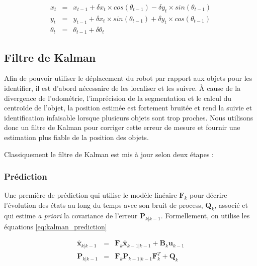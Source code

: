 \begin{equation}
	\begin{array}{rcl}
		x_t &=& x_{t-1} + \delta x_{t} \times cos(\theta_{t-1}) - \delta y_{t} \times sin(\theta_{t-1}) \\
		y_t &=& y_{t-1} + \delta x_{t} \times sin(\theta_{t-1}) + \delta y_{t} \times cos(\theta_{t-1}) \\
		\theta_t &=& \theta_{t-1} + \delta\theta_{t}
	\end{array}
	\label{eq:integ}
\end{equation}

\subsection{Filtre de Kalman }

Afin de pouvoir utiliser le déplacement du robot par rapport aux objets pour les identifier, il est d'abord nécessaire de les localiser et les suivre. À cause
de la divergence de l'odométrie, l'imprécision de la segmentation et le calcul
du centroïde de l'objet, la position estimée est fortement bruitée et rend la suivie et identification infaisable
lorsque plusieurs objets sont trop proches. Nous utilisons donc un filtre de Kalman pour corriger cette erreur de mesure et fournir une estimation plus fiable de la position des objets.

Classiquement le filtre de Kalman est mis à jour selon deux étapes : 

\subsubsection{Prédiction} Une première de prédiction qui utilise le modèle linéaire $\textbf{F}_{k}$ pour décrire l'évolution des états au long du temps avec son bruit de process, $\textbf{Q}_{k}$, associé et qui estime \textit{a priori} la covariance de l'erreur $\textbf{P}_{k|k-1}$. Formellement, on utilise les équations \ref{eq:kalman_prediction}

\begin{equation}
	\begin{array}{ccl}
		\hat{\textbf{x}}_{k|k-1} &=& \textbf{F}_{k}\hat{\textbf{x}}_{k-1|k-1} + \textbf{B}_{k} \textbf{u}_{k-1}\\
		\textbf{P}_{k|k-1} &=& \textbf{F}_{k} \textbf{P}_{k-1|k-1} \textbf{F}_{k}^{T} + \textbf{Q}_{k}
	\end{array}
	\label{eq:kalman_prediction}
\end{equation}

